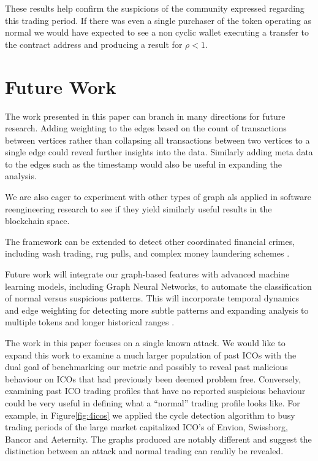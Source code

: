\documentclass[conference]{IEEEtran}
\begin{document}
These results help confirm the suspicions of the community expressed regarding this trading period. If there was even a single purchaser of the token operating as normal we would have expected to see a non cyclic wallet executing a transfer to the contract address and producing a result for $\rho < 1$.

\section{Future Work}
The work presented in this paper can branch in many directions for future research. Adding weighting to the edges based on the count of transactions between vertices rather than collapsing all transactions between two vertices to a single edge could reveal further insights into the data.  Similarly adding meta data to the edges such as the timestamp would also be useful in expanding the analysis.

We are also eager to experiment with other types of graph als applied in software reengineering research to see if they yield similarly useful results in the blockchain space.

The framework can be extended to detect other coordinated financial crimes, including wash trading, rug pulls, and complex money laundering schemes \cite{song2024identifying}.

Future work will integrate our graph-based features with advanced machine learning models, including Graph Neural Networks, to automate the classification of normal versus suspicious patterns. This will incorporate temporal dynamics and edge weighting for detecting more subtle patterns and expanding analysis to multiple tokens and longer historical ranges \cite{Harper2025STGNN, Chen2024Phishing, Sultana2025GNN, song2024identifying}.

The work in this paper focuses on a single known attack. We would like to expand this work to examine a much larger population of past ICOs with the dual goal of benchmarking our metric and possibly to reveal past malicious behaviour on ICOs that had previously been deemed problem free.  Conversely, examining past ICO trading profiles that have no reported suspicious behaviour could be very useful in defining what a ``normal'' trading profile looks like.  For example, in Figure\ref{fig:4icos} we applied the cycle detection algorithm to busy trading periods of the large market capitalized ICO's of Envion, Swissborg, Bancor and Aeternity. The graphs produced are notably different and suggest the distinction between an attack and normal trading can readily be revealed.
\end{document}
